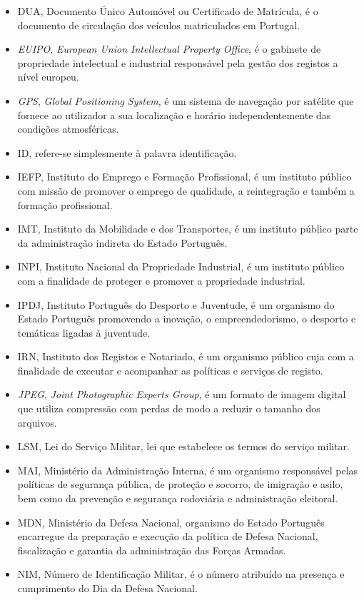 \begin{itemize}
	\item DUA, Documento Único Automóvel ou Certificado de Matrícula, é o documento de circulação dos veículos matriculados em Portugal.
	\item \emph{EUIPO}, \emph{European Union Intellectual Property Office}, é o gabinete de propriedade intelectual e industrial responsável pela gestão dos registos a nível europeu.
	\item \emph{GPS}, \emph{Global Positioning System}, é um sistema de navegação por satélite que fornece ao utilizador a sua localização e horário independentemente das condições atmosféricas.
	\item ID, refere-se simplesmente à palavra identificação.
	\item IEFP, Instituto do Emprego e Formação Profissional, é um instituto público com missão de promover o emprego de qualidade, a reintegração e também a formação profissional.
	\item IMT, Instituto da Mobilidade e dos Transportes, é um instituto público parte da administração indireta do Estado Português.
	\item INPI, Instituto Nacional da Propriedade Industrial, é um instituto público com a finalidade de proteger e promover a propriedade industrial.
	\item IPDJ, Instituto Português do Desporto e Juventude, é um organismo do Estado Português promovendo a inovação, o empreendedorismo, o desporto e temáticas ligadas à juventude.
	\item IRN, Instituto dos Registos e Notariado, é um organismo público cuja com a finalidade de executar e acompanhar as políticas e serviços de registo.
	\item \emph{JPEG}, \emph{Joint Photographic Experts Group}, é um formato de imagem digital que utiliza compressão com perdas de modo a reduzir o tamanho dos arquivos.
	\item LSM, Lei do Serviço Militar, lei que estabelece os termos do serviço militar.
	\item MAI, Ministério da Administração Interna, é um organismo responsável pelas políticas de segurança pública, de proteção e socorro, de imigração e asilo, bem como da prevenção e segurança rodoviária e administração eleitoral.
	\item MDN, Ministério da Defesa Nacional, organismo do Estado Português encarregue da preparação e execução da política de Defesa Nacional, fiscalização e garantia da administração das Forças Armadas.
	\item NIM, Número de Identificação Militar, é o número atribuído na presença e cumprimento do Dia da Defesa Nacional.

\end{itemize}
